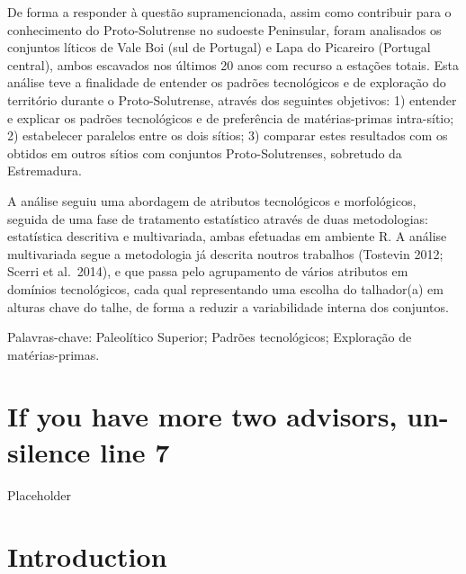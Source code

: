 \documentclass[12pt,twoside]{reedthesis}
\begin{document}
\begin{resumo}
    De forma a responder à questão supramencionada, assim como contribuir para o conhecimento do Proto-Solutrense no sudoeste Peninsular, foram analisados os conjuntos líticos de Vale Boi (sul de Portugal) e Lapa do Picareiro (Portugal central), ambos escavados nos últimos 20 anos com recurso a estações totais. Esta análise teve a finalidade de entender os padrões tecnológicos e de exploração do território durante o Proto-Solutrense, através dos seguintes objetivos: 1) entender e explicar os padrões tecnológicos e de preferência de matérias-primas intra-sítio; 2) estabelecer paralelos entre os dois sítios; 3) comparar estes resultados com os obtidos em outros sítios com conjuntos Proto-Solutrenses, sobretudo da Estremadura.
    
    A análise seguiu uma abordagem de atributos tecnológicos e morfológicos, seguida de uma fase de tratamento estatístico através de duas metodologias: estatística descritiva e multivariada, ambas efetuadas em ambiente R. A análise multivariada segue a metodologia já descrita noutros trabalhos (Tostevin 2012; Scerri et al.~2014), e que passa pelo agrupamento de vários atributos em domínios tecnológicos, cada qual representando uma escolha do talhador(a) em alturas chave do talhe, de forma a reduzir a variabilidade interna dos conjuntos.
    
    Palavras-chave: Paleolítico Superior; Padrões tecnológicos; Exploração de matérias-primas.
  \end{resumo}
  \hypersetup{linkcolor=black}
  \setcounter{tocdepth}{2}
  \tableofcontents

  \listoftables

  \listoffigures


\mainmatter %
\pagestyle{fancyplain} %

\hypertarget{if-you-have-more-two-advisors-un-silence-line-7}{%
\chapter{If you have more two advisors, un-silence line 7}\label{if-you-have-more-two-advisors-un-silence-line-7}}

Placeholder

\hypertarget{introduction}{%
\chapter{Introduction}\label{introduction}}
\end{document}
